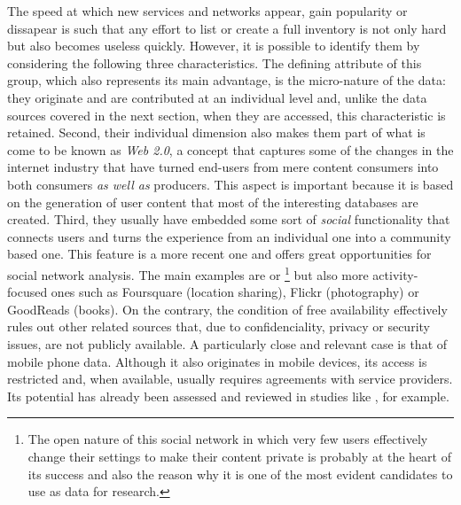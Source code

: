 \documentclass[12pt]{article}
\begin{document}
The speed at which new services and networks appear, gain popularity or
dissapear is such that any
effort to list or create a full inventory is not only hard but also becomes
useless quickly. However, it is possible to identify them by considering the following
three characteristics.
%
The defining attribute of this group, which also represents its main
advantage, is the micro-nature of the data: they originate and are
contributed at an individual level and, unlike 
the data sources covered in the next section, when they are accessed, this
characteristic is retained.
    Second, their individual dimension also makes them part of what is come to be known as \emph{Web 2.0}, a
    concept that captures some of the changes in the internet industry that have turned
    end-users from mere content consumers into both consumers \textit{as well as}
    producers. This aspect is important because it is based on the generation of
    user content that most of the interesting databases are created.
    Third, they usually have embedded some sort of \emph{social} functionality
    that connects users and turns the experience from an individual one into a
    community based one. This feature is a more recent one and offers great
    opportunities for social network analysis.
%
The main examples are \cite{facebook} or \cite{twitter}\footnote{The open
nature of this social network in which very few users effectively change their
settings to make their content private is probably at the heart of its success
and also the reason why it is one of the most evident candidates to use as data
for research.} but also more activity-focused ones such as Foursquare
(location sharing), Flickr (photography) or GoodReads (books).
On the contrary, the condition of free availability effectively rules out other related sources that, due to
confidenciality, privacy or security issues, are not publicly available. A
particularly close and relevant case is that of mobile phone data. Although it also
originates in mobile devices, its access is restricted and, when available,
usually requires agreements with service providers. Its potential has
already been assessed and reviewed in studies like
\citealp{steenbruggenMobile2011}, for example.
\end{document}
